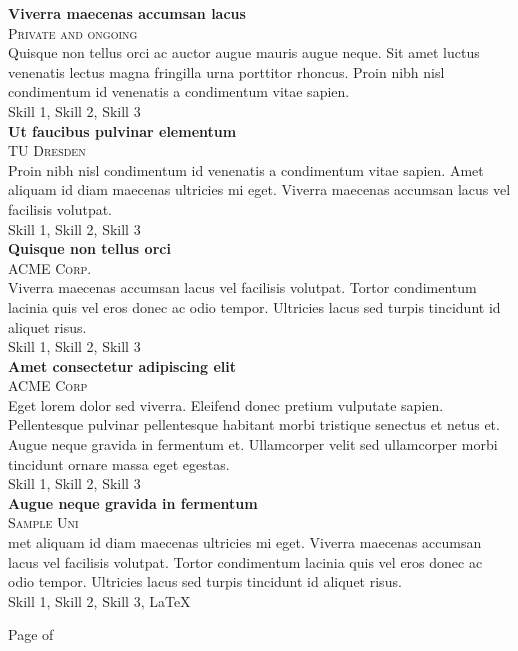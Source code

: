 \documentclass[oneside]{article}
\begin{document}
{\begin{minipage}[t][\dimexpr\textheight-2\fboxrule-2\fboxsep\relax][t]{\dimexpr0.6\textwidth-2\fboxrule-2\fboxsep\relax}
\begin{justify}
        {\large \textbf{Viverra maecenas accumsan lacus}} \\
        {\scshape{}\selectfont\footnotesize Private  and ongoing} \\
        Quisque non tellus orci ac auctor augue mauris augue neque. Sit amet luctus venenatis lectus magna fringilla urna porttitor rhoncus. Proin nibh nisl condimentum id venenatis a condimentum vitae sapien. \\[1ex]
        Skill 1, Skill 2, Skill 3 \\
        
        {\large \textbf{Ut faucibus pulvinar elementum}} \\
        {\scshape{}\selectfont\footnotesize TU Dresden } \\
        Proin nibh nisl condimentum id venenatis a condimentum vitae sapien. Amet aliquam id diam maecenas ultricies mi eget. Viverra maecenas accumsan lacus vel facilisis volutpat. \\[1ex]
        Skill 1, Skill 2, Skill 3 \\

        {\large \textbf{Quisque non tellus orci}} \\
        {\scshape{}\selectfont\footnotesize ACME Corp. } \\
        Viverra maecenas accumsan lacus vel facilisis volutpat. Tortor condimentum lacinia quis vel eros donec ac odio tempor. Ultricies lacus sed turpis tincidunt id aliquet risus. \\[1ex]
        Skill 1, Skill 2, Skill 3 \\
        
        {\large \textbf{Amet consectetur adipiscing elit}} \\
        {\scshape{}\selectfont\footnotesize ACME Corp } \\
        Eget lorem dolor sed viverra. Eleifend donec pretium vulputate sapien. Pellentesque pulvinar pellentesque habitant morbi tristique senectus et netus et. Augue neque gravida in fermentum et. Ullamcorper velit sed ullamcorper morbi tincidunt ornare massa eget egestas. \\[1ex]
        Skill 1, Skill 2, Skill 3 \\
        
        {\large \textbf{Augue neque gravida in fermentum}} \\
        {\scshape{}\selectfont\footnotesize Sample Uni } \\
        met aliquam id diam maecenas ultricies mi eget. Viverra maecenas accumsan lacus vel facilisis volutpat. Tortor condimentum lacinia quis vel eros donec ac odio tempor. Ultricies lacus sed turpis tincidunt id aliquet risus. \\[1ex]
        Skill 1, Skill 2, Skill 3, \LaTeX 
        \end{justify}
        \vfill%
        {\hfill\small{}\selectfont Page \thepage of \pageref{LastPage}\hfill}
    \end{minipage}
}
\end{document}
